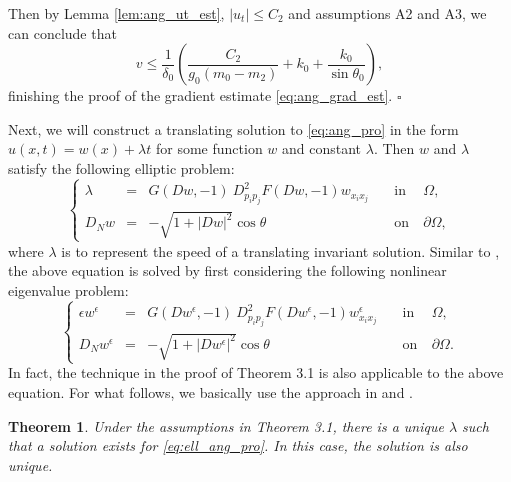 \documentclass[12pt]{article}
\numberwithin{equation}{section}
\theoremstyle{plain}
\newtheorem{theorem}{Theorem}[section]
\theoremstyle{definition}
\theoremstyle{remark}
\begin{document}
Then by Lemma \ref{lem:ang_ut_est}, $|u_t|\leq C_2$ and assumptions A2 and A3, we 
can conclude that 
\begin{equation}
    v \leq \frac{1}{\delta_0} \left( \frac{C_2}{g_0 (m_0-m_2)} + k_0 + \frac{k_0}{\sin{\theta_0}} \right),
\end{equation}
finishing the proof of the gradient estimate \eqref{eq:ang_grad_est}.
\hfill$\square$


Next, we will construct a translating solution to \eqref{eq:ang_pro} in the form 
$u(x,t) = w(x) + \lambda t$ for some function $w$ and constant $\lambda$.
Then $w$ and $\lambda$ satisfy the following elliptic problem:
\begin{equation*} 
\left\{ \begin{array}{cllcl}
    \lambda & =& G (Dw,-1) \ D^2_{p_i p_j} F (Dw,-1) w_{x_i x_j}    \quad & \text{in} & \ \Omega,  \\
     D_N w & = & - \sqrt{1+|Dw|^2} \cos \theta \quad & \text{on} & \ \partial \Omega,
\end{array} \right.
\end{equation*}
where $\lambda$ is to represent the speed of a translating invariant solution.
Similar to \cite{AW2}, the above equation is solved by first considering the following nonlinear eigenvalue problem:
\begin{equation} \label{eq:ang_eign_pro}
\left\{ \begin{array}{cllcl}
     \epsilon w^{\epsilon} &=& G (Dw^{\epsilon},-1) \ D^2_{p_i p_j} F (Dw^{\epsilon},-1) w^{\epsilon}_{x_i x_j}    \quad & \text{in} & \ \Omega,  \\
     D_N w^{\epsilon} &=& - \sqrt{1+|Dw^{\epsilon}|^2} \cos \theta \quad & \text{on} & \ \partial \Omega. 
\end{array} \right.
\end{equation}
In fact, the technique in the proof of Theorem 3.1 is also applicable to the above equation. 
For what follows, we basically use the approach in \cite{AW2} and \cite{GMWW}.
\begin{theorem}
Under the assumptions in Theorem 3.1, there is a unique $\lambda$ such that a solution exists for \eqref{eq:ell_ang_pro}.
In this case, the solution is also unique.
\end{theorem}
\end{document}
